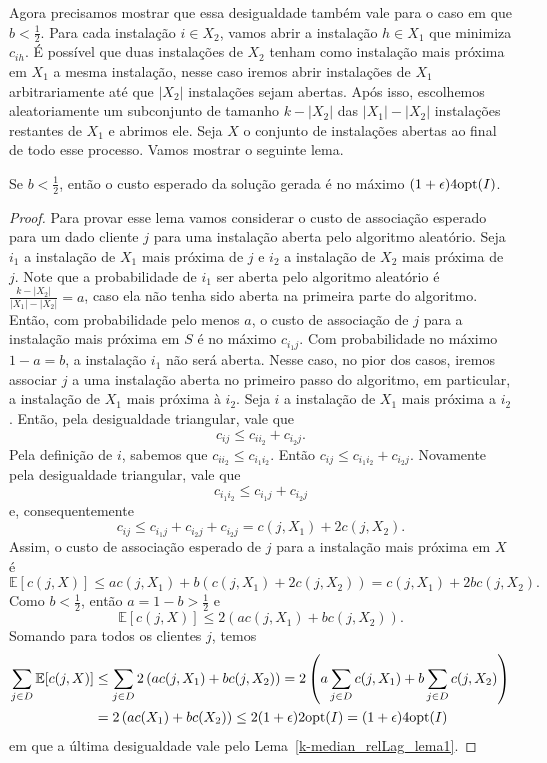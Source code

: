 Agora precisamos mostrar que essa desigualdade também vale para o caso em que $ b < \frac{1}{2}$. Para cada instalação $i \in X_2$, vamos abrir a instalação $h \in X_1$ que minimiza $c_{ih}$. É possível que duas instalações de $X_2$ tenham como instalação mais próxima em $X_1$ a mesma instalação, nesse caso iremos abrir instalações de $X_1$ arbitrariamente até que $|X_2|$ instalações sejam abertas. Após isso, escolhemos aleatoriamente um subconjunto de tamanho $k - |X_2|$ das $|X_1| - |X_2|$ instalações restantes de $X_1$ e abrimos ele. Seja $X$ o conjunto de instalações abertas ao final de todo esse processo. Vamos mostrar o seguinte lema.
\begin{lemma}
    \label{k-median_relLag_lema2}
    Se $b < \frac{1}{2}$, então o custo esperado da solução gerada é no máximo $(1 + \epsilon)4\mathrm{opt}(I)$.
\end{lemma}
\begin{proof}
Para provar esse lema vamos considerar o custo de associação esperado para um dado cliente $j$ para uma instalação aberta pelo algoritmo aleatório. Seja $i_1$ a instalação de $X_1$ mais próxima de $j$ e $i_2$ a instalação de $X_2$ mais próxima de $j$. Note que a probabilidade de $i_1$ ser aberta pelo algoritmo aleatório é $\frac{k - |X_2|}{|X_1| - |X_2|} = a$, caso ela não tenha sido aberta na primeira parte do algoritmo. Então, com probabilidade pelo menos $a$, o custo de associação de $j$ para a instalação mais próxima em $S$ é no máximo $c_{i_1j}$. Com probabilidade no máximo $1 - a = b$, a instalação $i_1$ não será aberta. Nesse caso, no pior dos casos, iremos associar $j$ a uma instalação aberta no primeiro passo do algoritmo, em particular, a instalação de $X_1$ mais próxima à $i_2$. Seja $i$ a instalação  de $X_1$ mais próxima a $i_2$. Então, pela desigualdade triangular, vale que
\[c_{ij} \leq c_{ii_2} + c_{i_2j}.\]
Pela definição de $i$, sabemos que $c_{ii_2} \leq c_{i_1i_2}$. Então \(c_{ij} \leq c_{i_1i_2} + c_{i_2j}\). Novamente pela desigualdade triangular, vale que 
\[c_{i_1i_2} \leq c_{i_1j} + c_{i_2j}\]
e, consequentemente
\[c_{ij} \leq c_{i_1j} + c_{i_2j} + c_{i_2j} = c(j,X_1) + 2 c(j,X_2).\]
Assim, o custo de associação esperado de $j$ para a instalação mais próxima em $X$ é
\[\mathbb{E}[c(j,X)] \leq a c\left(j,X_1\right) + b\left(c(j,X_1) + 2 c(j,X_2)\right) = c(j,X_1) + 2bc(j,X_2).\] 
Como $b < \frac{1}{2}$, então $a = 1 - b > \frac{1}{2}$ e 
\[\mathbb{E}[c(j,X)] \leq 2\left( a c(j,X_1) + bc(j,X_2)\right).\]
Somando para todos os clientes $j$, temos
\begin{subequations}
    \begin{align*}
        \sum_{j \in D}\mathbb{E}[c(j,X)] &\leq \sum_{j \in D}2\left( a c(j,X_1) + bc(j,X_2)\right) = 2\left(a \sum_{j\in D} c(j,X_1) + b \sum_{j \in D} c(j,X_2)\right) \\
        & = 2\left( a c(X_1) + b c(X_2)\right) \leq 2 (1 + \epsilon) 2 \mathrm{opt}(I) = (1+\epsilon) 4\mathrm{opt}(I)
    \end{align*}
\end{subequations}
em que a última desigualdade vale pelo Lema~\ref{k-median_relLag_lema1}.
\end{proof}


